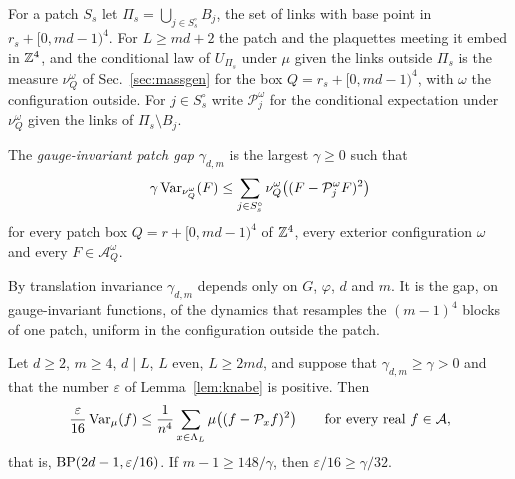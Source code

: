 For a patch $S_s$ let $\Pi_s=\bigcup_{j\in S^\circ_s}B_j$, the set of links
with base point in $r_s+[0,md-1)^4$. For $L\ge md+2$ the patch and the
plaquettes meeting it embed in $\mathbb{Z}^4$, and the conditional law of
$U_{\Pi_s}$ under $\mu$ given the links outside $\Pi_s$ is the measure
$\nu^\omega_{Q}$ of Sec.~\ref{sec:massgen} for the box $Q=r_s+[0,md-1)^4$,
with $\omega$ the configuration outside. For $j\in S^\circ_s$ write
$\mathcal P^\omega_j$ for the conditional expectation under $\nu^\omega_Q$
given the links of $\Pi_s\setminus B_j$.

\begin{definition}\label{def:patchgap}
The \emph{gauge-invariant patch gap} $\gamma_{d,m}$ is the largest
$\gamma\ge0$ such that
\[
\gamma\operatorname{Var}_{\nu^\omega_Q}(F)\le\sum_{j\in S^\circ_s}\nu^\omega_Q\bigl((F-
\mathcal P^\omega_jF)^2\bigr)
\]
for every patch box $Q=r+[0,md-1)^4$ of $\mathbb{Z}^4$, every exterior
configuration $\omega$ and every $F\in\mathcal A^\omega_Q$.
\end{definition}

By translation invariance $\gamma_{d,m}$ depends only on $G$, $\varphi$,
$d$ and $m$. It is the gap, on gauge-invariant functions, of the dynamics
that resamples the $(m-1)^4$ blocks of one patch, uniform in the
configuration outside the patch.

\begin{theorem}\label{thm:finite}
Let $d\ge2$, $m\ge4$, $d\mid L$, $L$ even, $L\ge2md$, and suppose that
$\gamma_{d,m}\ge\gamma>0$ and that the number $\varepsilon$ of
Lemma~\ref{lem:knabe} is positive. Then
\[
\frac{\varepsilon}{16}\operatorname{Var}_\mu(f)\le\frac1{n^4}\sum_{x\in\Lambda_L}\mu\bigl(
(f-\mathcal P_xf)^2\bigr)\qquad\text{for every real }f\in\mathcal A,
\]
that is, $\mathrm{BP}(2d-1,\varepsilon/16)$. If $m-1\ge148/\gamma$, then
$\varepsilon/16\ge\gamma/32$.
\end{theorem}

